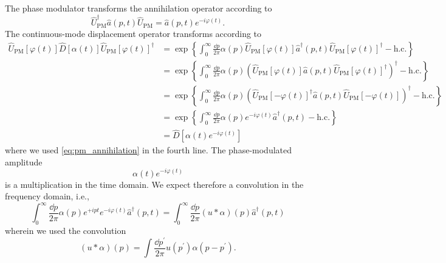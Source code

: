 The phase modulator transforms the annihilation operator according to~\cite[p.~38]{Leonhardt2010}
\begin{equation}
	\hat{U}_\text{PM}^\dagger
	\hat{a}(p,t)
	\hat{U}_\text{PM}
	=
	\hat{a}(p,t)
	e^{-i\varphi(t)}
	\label{eq:pm_annihilation}
	.
\end{equation}
The continuous-mode displacement operator transforms according to
\begin{equation}
	\begin{split}
		\hat{U}_\text{PM}\left[\varphi(t)\right]
		\hat{D}\left[\alpha(t)\right]
		\hat{U}_\text{PM}\left[\varphi(t)\right]^\dagger
		&=
		\exp\left\{
			\int_0^\infty\frac{\dd{p}}{2\pi}
			\alpha(p)
			\hat{U}_\text{PM}\left[\varphi(t)\right]
			\hat{a}^\dagger(p,t)
			\hat{U}_\text{PM}\left[\varphi(t)\right]^\dagger
			-
			\text{h.c.}
		\right\}
		\\
		&=
		\exp\left\{
			\int_0^\infty\frac{\dd{p}}{2\pi}
			\alpha(p)
			\left(
				\hat{U}_\text{PM}\left[\varphi(t)\right]
				\hat{a}(p,t)
				\hat{U}_\text{PM}\left[\varphi(t)\right]^\dagger
			\right)^\dagger
			-
			\text{h.c.}
		\right\}
		\\
		&=
		\exp\left\{
			\int_0^\infty\frac{\dd{p}}{2\pi}
			\alpha(p)
			\left(
				\hat{U}_\text{PM}\left[-\varphi(t)\right]^\dagger
				\hat{a}(p,t)
				\hat{U}_\text{PM}\left[-\varphi(t)\right]
			\right)^\dagger
			-
			\text{h.c.}
		\right\}
		\\
		&=
		\exp\left\{
			\int_0^\infty\frac{\dd{p}}{2\pi}
			\alpha(p)
			e^{-i\varphi(t)}
			\hat{a}^\dagger(p,t)
			-
			\text{h.c.}
		\right\}
		\\
		&=
		\hat{D}\left[
			\alpha(t)
			e^{-i\varphi(t)}
		\right]
	\end{split}
\end{equation}
where we used \cref{eq:pm_annihilation} in the fourth line.
The phase-modulated amplitude
\begin{equation}
	\alpha(t)e^{-i\varphi(t)}
\end{equation}
is a multiplication in the time domain.
We expect therefore a convolution in the frequency domain, i.e.,
\begin{equation}
	\int_0^\infty\frac{\dd{p}}{2\pi}
	\alpha(p)
	e^{+ipt}
	e^{-i\varphi(t)}
	\hat{a}^\dagger(p,t)
	=
	\int_0^\infty\frac{\dd{p}}{2\pi}
	\left(u*\alpha\right)(p)
	\hat{a}^\dagger(p,t)
\end{equation}
wherein we used the convolution
\begin{equation}
	\left(u*\alpha\right)(p)
	=
	\int\frac{\dd{p^\prime}}{2\pi}
	u(p^\prime)
	\alpha(p-p^\prime)
	.
\end{equation}
